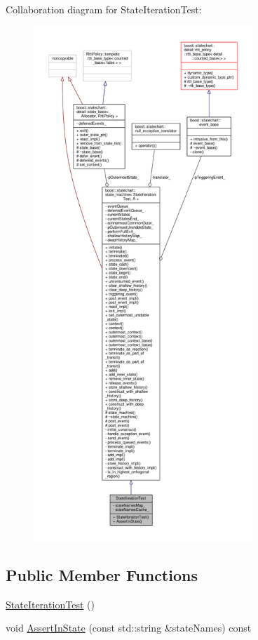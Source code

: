 Collaboration diagram for State\+Iteration\+Test\+:
\nopagebreak
\begin{figure}[H]
\begin{center}
\leavevmode
\includegraphics[height=550pt]{struct_state_iteration_test__coll__graph}
\end{center}
\end{figure}
\subsection*{Public Member Functions}
\begin{DoxyCompactItemize}
\item 
\mbox{\hyperlink{struct_state_iteration_test_a02eecebd37021d75721d681a5a4ae310}{State\+Iteration\+Test}} ()
\item 
void \mbox{\hyperlink{struct_state_iteration_test_a4277e169f872f9e9ba4d1d933ab32722}{Assert\+In\+State}} (const std\+::string \&state\+Names) const
\end{DoxyCompactItemize}

